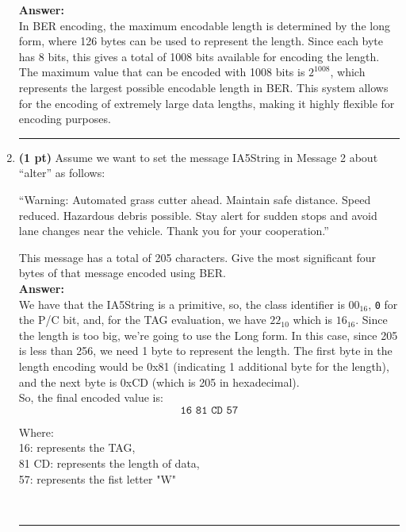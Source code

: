 \documentclass[a4paper,10pt]{article}
\begin{document}
\begin{enumerate}[label=\textbf{Question \arabic*.}]
    \textbf{Answer:} \\
    In BER encoding, the maximum encodable length is determined by the long form, where 126 bytes can be used to represent the length. Since each byte has 8 bits, this gives a total of 1008 bits available for encoding the length. The maximum value that can be encoded with 1008 bits is $2^{1008}$, which represents the largest possible encodable length in BER. This system allows for the encoding of extremely large data lengths, making it highly flexible for encoding purposes.
    
    \noindent\rule{\textwidth}{0.4mm}

    \item \textbf{(1 pt)} Assume we want to set the message IA5String in Message 2 about “alter” as follows:
    \begin{center}
        “Warning: Automated grass cutter ahead. Maintain safe distance. Speed reduced. Hazardous debris possible. Stay alert for sudden stops and avoid lane changes near the vehicle. Thank you for your cooperation.”
    \end{center}

    This message has a total of 205 characters. Give the most significant four bytes of that message encoded using BER. \\

    \textbf{Answer:} \\
    We have that the IA5String is a primitive, so, the class identifier is \texttt{$00_{16}$}, \texttt{0} for the P/C bit, and, for the TAG evaluation, we have \texttt{$22_{10}$} which is \texttt{$16_{16}$}. Since the length is too big, we're going to use the Long form.
    In this case, since 205 is less than 256, we need 1 byte to represent the length. The first byte in the length encoding would be 0x81 (indicating 1 additional byte for the length), and the next byte is 0xCD (which is 205 in hexadecimal). \\
    So, the final encoded value is:\\
    \[\texttt{16 81 CD 57}\]
    \parbox{\textwidth}{
        \small
        Where: \\
        16: represents the TAG, \\
        81 CD: represents the length of data, \\
        57: represents the fist letter "W"
    } \\

    \noindent\rule{\textwidth}{0.4mm}


\end{enumerate}
\end{document}
